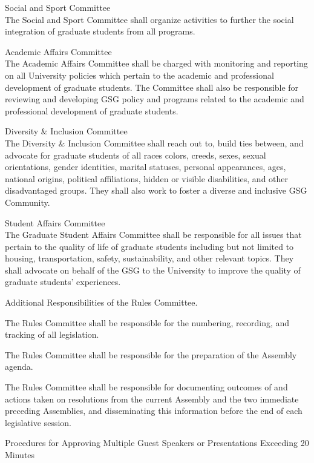 \begin{bylaws-number}
\begin{bylaws-number}
    \item Social and Sport Committee \hfill \\
The Social and Sport Committee shall organize activities to further the social integration of graduate students from all programs.
    \item Academic Affairs Committee \hfill \\
The Academic Affairs Committee shall be charged with monitoring and reporting on all University policies which pertain to the academic and professional development of graduate students. The Committee shall also be responsible for reviewing and developing GSG policy and programs related to the academic and professional development of graduate students.
    \item Diversity \& Inclusion Committee \hfill \\
The Diversity \& Inclusion Committee shall reach out to, build ties between, and advocate for graduate students of all races colors, creeds, sexes, sexual orientations, gender identities, marital statuses, personal appearances, ages, national origins, political affiliations, hidden or visible disabilities, and other disadvantaged groups. They shall also work to foster a diverse and inclusive GSG Community.
  \item Student Affairs Committee \hfill \\
The Graduate Student Affairs Committee shall be responsible for all issues that pertain to the quality of life of graduate students including but not limited to housing, transportation, safety, sustainability, and other relevant topics. They shall advocate on behalf of the GSG to the University to improve the quality of graduate students’ experiences.
  \end{bylaws-number}
  \item Additional Responsibilities of the Rules Committee.
  \begin{bylaws-number}
    \item The Rules Committee shall be responsible for the numbering, recording, and tracking of all legislation.
    \item The Rules Committee shall be responsible for the preparation of the Assembly agenda.
    \item The Rules Committee shall be responsible for documenting outcomes of and actions taken on resolutions from the current Assembly and the two immediate preceding Assemblies, and disseminating this information before the end of each legislative session.
    \item Procedures for Approving Multiple Guest Speakers or Presentations Exceeding 20 Minutes

\end{bylaws-number}
\end{bylaws-number}
